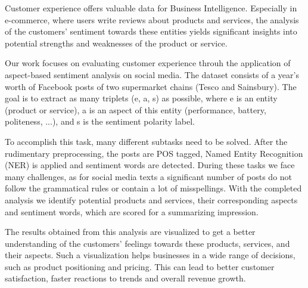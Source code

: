 Customer experience offers valuable data for Business Intelligence. Especially in e-commerce, where users write reviews about products and services, the analysis of the customers' sentiment towards these entities yields significant insights into potential strengths and weaknesses of the product or service.

Our work focuses on evaluating customer experience throuh the application of aspect-based sentiment analysis on social media. The dataset consists of a year's worth of Facebook posts of two supermarket chains (Tesco and Sainsbury). The goal is to extract as many triplets (e, a, s) as possible, where e is an entity (product or service), a is an aspect of this entity (performance, battery, politeness, ...), and s is the sentiment polarity label.

To accomplish this task, many different subtasks need to be solved. After the rudimentary preprocessing, the posts are POS tagged, Named Entity Recognition (NER) is applied and sentiment words are detected. During these tasks we face many challenges, as for social media texts a significant number of posts do not follow the grammatical rules or contain a lot of misspellings. With the completed analysis we identify potential products and services, their corresponding aspects and sentiment words, which are scored for a summarizing impression.

The results obtained from this analysis are visualized to get a better understanding of the customers' feelings towards these products, services, and their aspects. Such a visualization helps businesses in a wide range of decisions, such as product positioning and pricing. This can lead to better customer satisfaction, faster reactions to trends and overall revenue growth.